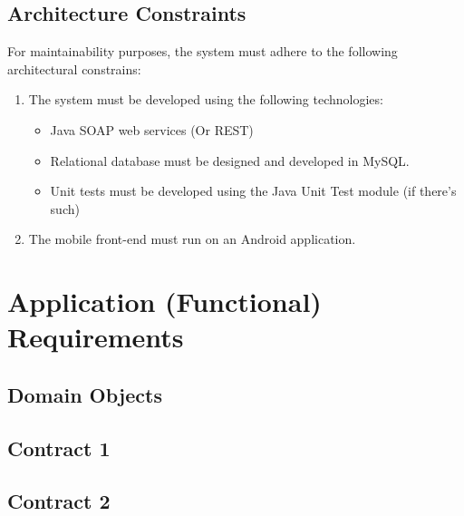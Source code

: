 \documentclass[12pt]{article}
\begin{document}
	                
	                \vspace{0.1in}
                	\subsection{Architecture Constraints}
                	For maintainability purposes, the system must adhere to the following architectural constrains:
                	
                	\begin{enumerate}
	                	\item The system must be developed using the following technologies:
	                	\begin{itemize}
		                	\item Java SOAP web services (Or REST)
		                	\item Relational database must be designed and developed in MySQL.
		                	\item Unit tests must be developed using the Java Unit Test module (if there's such)
	                	\end{itemize}
	                	\item The mobile front-end must run on an Android application.
	                	
                	\end{enumerate}
                	
                	
                \section{Application (Functional) Requirements}
                	\subsection{Domain Objects}
                	
                	\subsection{Contract 1}
                	
                	\subsection{Contract 2}
                	
\end{document}
